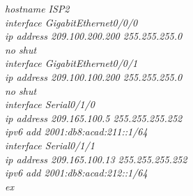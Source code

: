 \documentclass[a4paper, 12pt]{article}
\begin{document}
\hspace*{2cm}\textit{hostname ISP2\\
\hspace*{2cm}interface GigabitEthernet0/0/0\\
\hspace*{2cm}ip address 209.100.200.200 255.255.255.0\\
\hspace*{2cm}no shut\\
\hspace*{2cm}interface GigabitEthernet0/0/1\\
\hspace*{2cm}ip address 209.100.100.200 255.255.255.0\\
\hspace*{2cm}no shut\\
\hspace*{2cm}interface Serial0/1/0\\
\hspace*{2cm}ip address 209.165.100.5 255.255.255.252\\
\hspace*{2cm}ipv6 add 2001:db8:acad:211::1/64\\
\hspace*{2cm}interface Serial0/1/1\\
\hspace*{2cm}ip address 209.165.100.13 255.255.255.252\\
\hspace*{2cm}ipv6 add 2001:db8:acad:212::1/64\\
\hspace*{2cm}ex\\}
\end{document}
